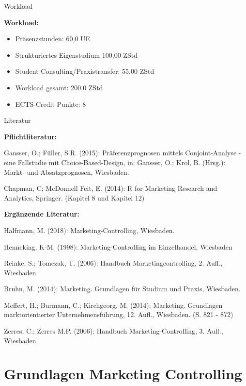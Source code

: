 \documentclass[12pt,ngerman,a4paper,ignorenonframetext,]{beamer}
\providecommand{\tightlist}{%
  \setlength{\itemsep}{0pt}\setlength{\parskip}{0pt}}
\begin{document}
\begin{frame}{Workload}
\protect\hypertarget{workload}{}

\textbf{Workload:}

\begin{itemize}
\tightlist
\item
  Präsenzstunden: 60,0 UE
\item
  Strukturiertes Eigenstudium 100,00 ZStd
\item
  Student Consulting/Praxistransfer: 55,00 ZStd
\item
  Workload gesamt: 200,0 ZStd
\item
  ECTS-Credit Punkte: 8
\end{itemize}

\end{frame}

\begin{frame}{Literatur}
\protect\hypertarget{literatur}{}

\textbf{Pflichtliteratur:}

Gansser, O.; Füller, S.\thinspace{}R. (2015): Präferenzprognosen mittels
Conjoint-Analyse - eine Fallstudie mit Choice-Based-Design, in: Gansser,
O.; Krol, B. (Hrsg.): Markt- und Absatzprognosen, Wiesbaden.

Chapman, C; McDonnell Feit, E. (2014): R for Marketing Research and
Analytics, Springer. (Kapitel 8 und Kapitel 12)

\textbf{Ergänzende Literatur:}

Halfmann, M. (2018): Marketing-Controlling, Wiesbaden.

Henneking, K-M. (1998): Marketing-Controlling im Einzelhandel, Wiesbaden

Reinke, S.; Tomczak, T. (2006): Handbuch Marketingcontrolling, 2. Aufl.,
Wiesbaden

Bruhn, M. (2014): Marketing. Grundlagen für Studium und Praxis,
Wiesbaden.

Meffert, H.; Burmann, C.; Kirchgeorg, M. (2014): Marketing. Grundlagen
marktorientierter Unternehmensführung, 12. Aufl., Wiesbaden. (S. 821 -
872)

Zerres, C.; Zerres M.\thinspace{}P. (2006): Handbuch
Marketing-Controlling, 3. Aufl., Wiesbaden

\end{frame}

\hypertarget{grundlagen-marketing-controlling}{%
\section{Grundlagen Marketing
Controlling}\label{grundlagen-marketing-controlling}}
\end{document}
